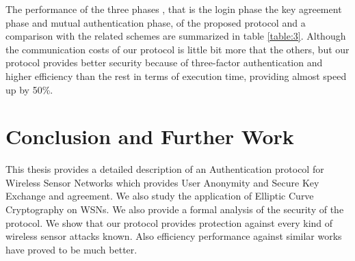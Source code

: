 \documentclass[a4paper,12pt]{report}
\begin{document}
\begin{table}[h!]
\caption{The execution time of cryptographic operations}
\label{table:3}
\end{table}
The performance of the three phases , that is the login phase the
key agreement phase and mutual authentication phase, of the proposed
protocol and a comparison with the related schemes are summarized in
table \ref{table:3}. Although the communication costs of our
protocol is little bit more that the others, but our protocol
provides better security because of three-factor authentication and
higher efficiency than the rest in terms of execution time,
providing almost speed up by 50\%.






\afterpage{\null\newpage}
\chapter{Conclusion and Further Work}
\label{Ch6} This thesis provides a detailed description of an
Authentication protocol for Wireless Sensor Networks which provides
User Anonymity and Secure Key Exchange and agreement. We also study
the application of Elliptic Curve Cryptography on WSNs. We also
provide a formal analysis of the security of the protocol. We show
that our protocol provides protection against every kind of wireless
sensor attacks known. Also efficiency performance against similar
works have proved to be much better.
\end{document}
